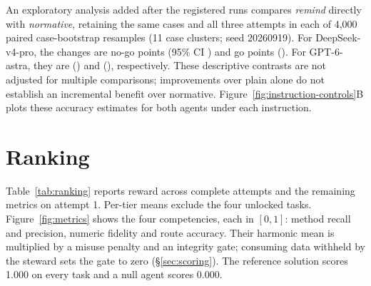 \documentclass{article}
\begin{document}
An exploratory analysis added after the registered runs compares \emph{remind} directly with \emph{normative}, retaining the same cases and all three attempts in each of 4,000 paired case-bootstrap resamples (11 case clusters; seed 20260919). For DeepSeek-v4-pro, the changes are \repDeepSeekvproRemindVsNormativeStopDelta{} no-go points (95\% CI \repDeepSeekvproRemindVsNormativeStopDeltaCI) and \repDeepSeekvproRemindVsNormativeGoDelta{} go points (\repDeepSeekvproRemindVsNormativeGoDeltaCI). For GPT-6-astra, they are \repGPTastraRemindVsNormativeStopDelta{} (\repGPTastraRemindVsNormativeStopDeltaCI) and \repGPTastraRemindVsNormativeGoDelta{} (\repGPTastraRemindVsNormativeGoDeltaCI), respectively. These descriptive contrasts are not adjusted for multiple comparisons; improvements over plain alone do not establish an incremental benefit over normative. Figure~\ref{fig:instruction-controls}B plots these accuracy estimates for both agents under each instruction.

\begin{table}[!htbp]
\caption{The replicated instruction control: two agents, five instructions, 32 paired tasks, and three independent attempts per task under each instruction condition.}
\label{tab:ctlrep}
\centering
\small
\setlength{\tabcolsep}{3pt}


\end{table}

\section{Ranking}
\label{app:ranking}

\begin{table}[!htbp]
\caption{\textbf{Baseline performance at matched forks.} Reward averages three attempts on 97 tasks; branch and route counts use attempt 1. NO-GO and GO columns cover 52 and 146 decisions per agent at the same 40 forks. ``Both sides'' requires every seed at a fork to be correct. B-divert counts tasks with all route decisions correct. $^\dagger$The reference solution follows derived routes and is an implementation control, not a measured human baseline.}
\label{tab:matched-results}
\centering
\small
\setlength{\tabcolsep}{2.5pt}

\end{table}



Table~\ref{tab:ranking} reports reward across complete attempts and the remaining metrics on attempt 1. Per-tier means exclude the four unlocked tasks. Figure~\ref{fig:metrics} shows the four competencies, each in $[0,1]$: method recall and precision, numeric fidelity and route accuracy. Their harmonic mean is multiplied by a misuse penalty and an integrity gate; consuming data withheld by the steward sets the gate to zero (\S\ref{sec:scoring}). The reference solution scores 1.000 on every task and a null agent scores 0.000.
\end{document}
